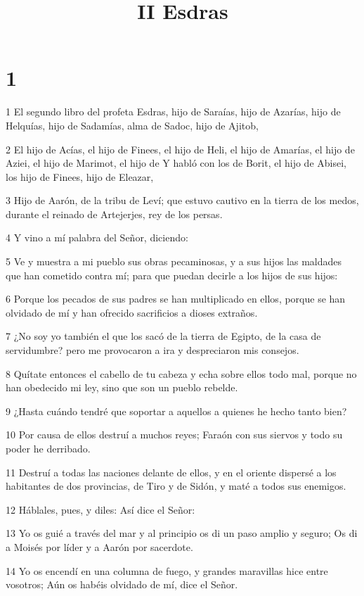 

\title{II Esdras}

\chapter{1}

\par 1 El segundo libro del profeta Esdras, hijo de Saraías, hijo de Azarías, hijo de Helquías, hijo de Sadamías, alma de Sadoc, hijo de Ajitob,
\par 2 El hijo de Acías, el hijo de Finees, el hijo de Heli, el hijo de Amarías, el hijo de Aziei, el hijo de Marimot, el hijo de Y habló con los de Borit, el hijo de Abisei, los hijo de Finees, hijo de Eleazar,
\par 3 Hijo de Aarón, de la tribu de Leví; que estuvo cautivo en la tierra de los medos, durante el reinado de Artejerjes, rey de los persas.
\par 4 Y vino a mí palabra del Señor, diciendo:
\par 5 Ve y muestra a mi pueblo sus obras pecaminosas, y a sus hijos las maldades que han cometido contra mí; para que puedan decirle a los hijos de sus hijos:
\par 6 Porque los pecados de sus padres se han multiplicado en ellos, porque se han olvidado de mí y han ofrecido sacrificios a dioses extraños.
\par 7 ¿No soy yo también el que los sacó de la tierra de Egipto, de la casa de servidumbre? pero me provocaron a ira y despreciaron mis consejos.
\par 8 Quítate entonces el cabello de tu cabeza y echa sobre ellos todo mal, porque no han obedecido mi ley, sino que son un pueblo rebelde.
\par 9 ¿Hasta cuándo tendré que soportar a aquellos a quienes he hecho tanto bien?
\par 10 Por causa de ellos destruí a muchos reyes; Faraón con sus siervos y todo su poder he derribado.
\par 11 Destruí a todas las naciones delante de ellos, y en el oriente dispersé a los habitantes de dos provincias, de Tiro y de Sidón, y maté a todos sus enemigos.
\par 12 Háblales, pues, y diles: Así dice el Señor:
\par 13 Yo os guié a través del mar y al principio os di un paso amplio y seguro; Os di a Moisés por líder y a Aarón por sacerdote.
\par 14 Yo os encendí en una columna de fuego, y grandes maravillas hice entre vosotros; Aún os habéis olvidado de mí, dice el Señor.
